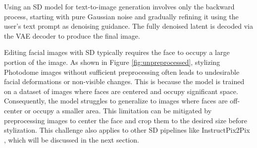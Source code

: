Using an SD model for text-to-image generation involves only the backward process, starting with pure Gaussian noise and gradually refining it using the user's text prompt as denoising guidance. The fully denoised latent is decoded via the VAE decoder to produce the final image.

Editing facial images with SD typically requires the face to occupy a large portion of the image. As shown in Figure \ref{fig:unpreprocessed}, stylizing Photodome images without sufficient preprocessing often leads to undesirable facial deformations or non-visible changes. This is because the model is trained on a dataset of images where faces are centered and occupy significant space. Consequently, the model struggles to generalize to images where faces are off-center or occupy a smaller area. This limitation can be mitigated by preprocessing images to center the face and crop them to the desired size before stylization. This challenge also applies to other SD pipelines like InstructPix2Pix \citep{Brooks.2023}, which will be discussed in the next section.

